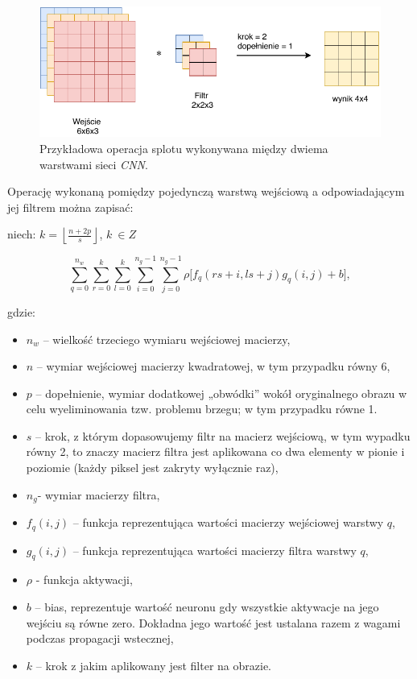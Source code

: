 \begin{figure}[ht]
\centerline{\includegraphics[scale=0.8]{resources/cnn/splot_w_cnn.pdf}}
\caption{Przykładowa operacja splotu wykonywana między dwiema warstwami sieci \textit{CNN}.}
\label{fig:splot}
\end{figure}

Operację wykonaną pomiędzy pojedynczą warstwą wejściową a odpowiadającym jej filtrem można zapisać:

niech: \(k = \left\lfloor \frac{n + 2p}{s} \right\rfloor\), \(k\ \in Z\)

\[\sum_{q = 0}^{n_{w}}{\sum_{r = 0}^{k}{\sum_{l = 0}^{k}\sum_{i = 0}^{n_{g} - 1}{\sum_{j = 0}^{n_{g} - 1}{\rho\lbrack f_{q}\left( rs + i,ls + j \right) g_{q}\left( i,j \right) + b\rbrack}}}}, \tag{9}\]

gdzie:

\begin{itemize}
\item
  \(n_{w}\) -- wielkość trzeciego wymiaru wejściowej macierzy,
\item
  \(n\) -- wymiar wejściowej macierzy kwadratowej, w tym przypadku równy 6,
\item
  \(p\) -- dopełnienie, wymiar dodatkowej „obwódki'' wokół oryginalnego
  obrazu w celu wyeliminowania tzw. problemu brzegu; w tym przypadku
  równe 1.
\item
  \(s\) -- krok, z którym dopasowujemy filtr na macierz wejściową, w tym
  wypadku równy 2, to znaczy macierz filtra jest aplikowana co dwa
  elementy w pionie i poziomie (każdy piksel jest zakryty wyłącznie
  raz),
\item
  \(n_{g}\)- wymiar macierzy filtra,
\item
  \(f_{q}(i,j)\) -- funkcja reprezentująca wartości macierzy wejściowej
  warstwy \(q\),
\item
  \(g_{q}(i,j)\) -- funkcja reprezentująca wartości macierzy filtra
  warstwy \(q\),
\item
  \(\rho\) - funkcja aktywacji,
\item
  \(b\) -- bias, reprezentuje wartość neuronu gdy wszystkie aktywacje na jego wejściu są równe zero. Dokładna jego wartość jest ustalana razem z wagami podczas propagacji wstecznej,
\item
  \(k\) -- krok z jakim aplikowany jest filter na obrazie.
\end{itemize}

